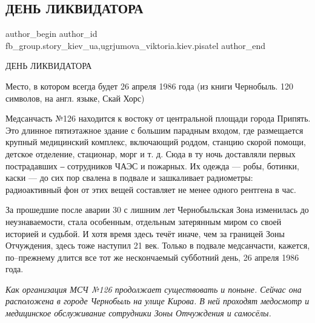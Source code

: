  
 
 
 
 
 
\subsection{ДЕНЬ ЛИКВИДАТОРА}
\label{sec:15_12_2021.fb.fb_group.story_kiev_ua.2.den_likvidatora}
 
\ifcmt
 author_begin
   author_id fb_group.story_kiev_ua,ugrjumova_viktoria.kiev.pisatel
 author_end
\fi

ДЕНЬ ЛИКВИДАТОРА

Место, в котором всегда будет 26 апреля 1986 года (из книги Чернобыль. 120
символов, на англ. языке, Скай Хорс)


Медсанчасть №126 находится к востоку от центральной площади города Припять. Это
длинное пятиэтажное здание с большим парадным входом, где размещается крупный
медицинский комплекс, включающий роддом, станцию скорой помощи, детское
отделение, стационар, морг и т. д. Сюда в ту ночь доставляли первых
пострадавших ‒ сотрудников ЧАЭС и пожарных. Их одежда — робы, ботинки, каски —
до сих пор свалена в подвале и зашкаливает радиометры: радиоактивный фон от
этих вещей составляет не менее одного рентгена в час.

За прошедшие после аварии 30 с лишним лет Чернобыльская Зона изменилась до
неузнаваемости, стала особенным, отдельным затерянным миром со своей историей и
судьбой. И хотя время здесь течёт иначе, чем за границей Зоны Отчуждения, здесь
тоже наступил 21 век. Только в подвале медсанчасти, кажется, по–прежнему длится
все тот же нескончаемый субботний день, 26 апреля 1986 года.

\begingroup
\em
Как организация МСЧ №126 продолжает существовать и поныне. Сейчас она
расположена в городе Чернобыль на улице Кирова. В ней проходят медосмотр и
медицинское обслуживание сотрудники Зоны Отчуждения и самосёлы.
\endgroup

